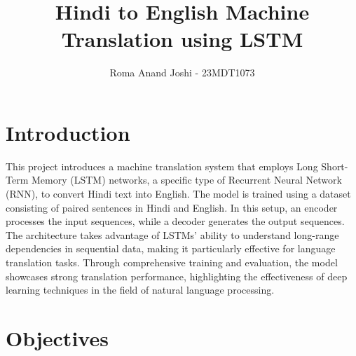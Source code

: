 \documentclass{article}
\title{Hindi to English Machine Translation using LSTM}
\author{Roma Anand Joshi - 23MDT1073}
\date{}
\begin{document}
\maketitle

\section{Introduction} 

This project introduces a machine translation system that employs Long Short-Term Memory (LSTM) networks, a specific type of Recurrent Neural Network (RNN), to convert Hindi text into English. The model is trained using a dataset consisting of paired sentences in Hindi and English. In this setup, an encoder processes the input sequences, while a decoder generates the output sequences. The architecture takes advantage of LSTMs' ability to understand long-range dependencies in sequential data, making it particularly effective for language translation tasks. Through comprehensive training and evaluation, the model showcases strong translation performance, highlighting the effectiveness of deep learning techniques in the field of natural language processing.


\section{Objectives}
\end{document}
